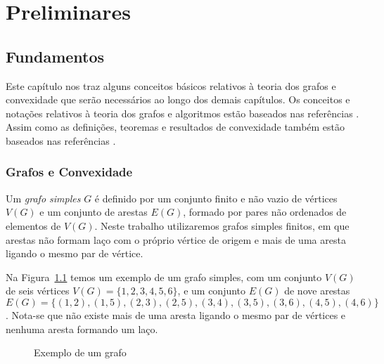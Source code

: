 \chapter{Preliminares}
\label{cap-fundamentos} 
\section{Fundamentos}
    Este capítulo nos traz alguns conceitos básicos relativos à teoria dos grafos e convexidade que serão necessários ao longo dos demais capítulos.
Os conceitos e notações relativos à teoria dos grafos e algoritmos
estão baseados nas referências \cite{Bondy1976,Cormen2002}. Assim como as  definições, teoremas e resultados de convexidade também estão baseados nas referências 
\cite{Balogh,Barbosa2012,Bollobas,CeciliaCenteno2012,Centeno,Coelho2014,Coelho2012,duarte2015complexity,Hon2016,De2016a,Penso2015,DraquePenso2014}.

\subsection{Grafos e Convexidade}
    
Um \textit{grafo simples} $G$ é definido por um conjunto finito e não vazio de vértices $V(G)$ e um conjunto de arestas $E(G)$, formado por pares não ordenados de elementos de $V(G)$. Neste trabalho utilizaremos grafos simples finitos, em que arestas não formam laço com o próprio vértice de origem e mais de uma aresta ligando o mesmo par de vértice.

Na Figura~\ref{fig:grafo-exemplo} temos um exemplo de um grafo simples, 
com um conjunto $V(G)$ de seis vértices $V(G) = \{1, 2, 3, 4, 5, 6\}$, 
e um conjunto $E(G)$ de nove arestas $E(G) = \{(1,2), (1,5), (2,3), (2,5), (3,4), (3,5), (3,6), (4,5), (4,6)\}$.
Nota-se que não existe mais de uma aresta ligando o mesmo par de vértices e nenhuma aresta formando um laço. 

\begin{figure}
\centering
{}
\caption{Exemplo de um grafo}
\label{fig:grafo-exemplo}
\end{figure}


